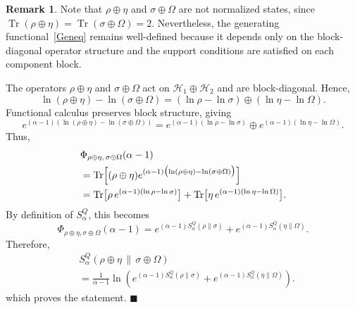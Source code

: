 \documentclass[a4paper, amsfonts, amssymb, amsmath, reprint, showkeys, nofootinbib, twoside, aps, pra]{revtex4-2}
\theoremstyle{definition}
\newtheorem{remark}{Remark}
\renewenvironment{proof}{\noindent{\bfseries Proof.}}{\hfill$\blacksquare$}
\begin{document}
\begin{remark}
Note that $\rho\oplus\eta$ and $\sigma\oplus\Omega$ are not normalized states, 
since $\operatorname{Tr}(\rho\oplus\eta)=\operatorname{Tr}(\sigma\oplus\Omega)=2$. 
Nevertheless, the generating functional~\eqref{Geneq} remains well-defined 
because it depends only on the block-diagonal operator structure and the support 
conditions are satisfied on each component block.
\end{remark}

\begin{proof}
The operators $\rho\oplus\eta$ and $\sigma\oplus\Omega$ act on 
$\mathcal{H}_1\oplus\mathcal{H}_2$ and are block-diagonal. Hence,
\begin{equation}
\ln(\rho\oplus\eta)-\ln(\sigma\oplus\Omega)
=
(\ln\rho-\ln\sigma)\oplus(\ln\eta-\ln\Omega).
\end{equation}
Functional calculus preserves block structure, giving
\begin{equation}
e^{(\alpha-1)(\ln(\rho\oplus\eta)-\ln(\sigma\oplus\Omega))}
=
e^{(\alpha-1)(\ln\rho-\ln\sigma)}
\oplus
e^{(\alpha-1)(\ln\eta-\ln\Omega)}.
\end{equation}
Thus,
\begin{equation}
\begin{aligned}
&\Phi_{\rho\oplus\eta,\,\sigma\oplus\Omega}(\alpha-1) \\
&= \operatorname{Tr}\Bigl[ (\rho\oplus\eta) e^{(\alpha-1)\bigl(\ln(\rho\oplus\eta)-\ln(\sigma\oplus\Omega)\bigr)} \Bigr] \\
&= \operatorname{Tr}\bigl[ \rho\,e^{(\alpha-1)(\ln\rho-\ln\sigma)} \bigr] + \operatorname{Tr}\bigl[ \eta\,e^{(\alpha-1)(\ln\eta-\ln\Omega)} \bigr].
\end{aligned}
\end{equation}
By definition of $S^Q_\alpha$, this becomes
\begin{equation}
\Phi_{\rho\oplus\eta,\sigma\oplus\Omega}(\alpha-1)
=
e^{(\alpha-1)S^Q_\alpha(\rho\|\sigma)}
+
e^{(\alpha-1)S^Q_\alpha(\eta\|\Omega)}.
\end{equation}
Therefore,
\begin{equation}
\begin{aligned}
&S^Q_\alpha(\rho\oplus\eta \,\|\, \sigma\oplus\Omega) \\
&= \frac{1}{\alpha-1} \ln \left( e^{(\alpha-1)S^Q_\alpha(\rho\|\sigma)} + e^{(\alpha-1)S^Q_\alpha(\eta\|\Omega)} \right).
\end{aligned}
\end{equation}
which proves the statement.
\end{proof}
\end{document}
